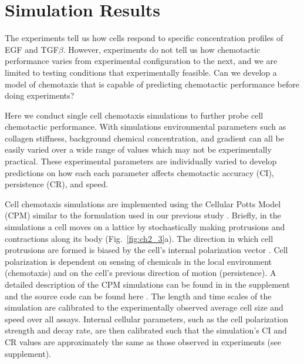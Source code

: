 \section{Simulation Results}

The experiments tell us how cells respond to specific concentration profiles of EGF and TGF$\beta$. However, experiments do not tell us how chemotactic performance varies from experimental configuration to the next, and we are limited to testing conditions that experimentally feasible. Can we develop a model of chemotaxis that is capable of predicting chemotactic performance before doing experiments?

Here we conduct single cell chemotaxis simulations to further probe cell chemotactic performance. With simulations environmental parameters such as collagen stiffness, background chemical concentration, and gradient can all be easily varied over a wide range of values which may not be experimentally practical. These experimental parameters are individually varied to develop predictions on how each each parameter affects chemotactic accuracy (CI), persistence (CR), and speed.

Cell chemotaxis simulations are implemented using the Cellular Potts Model (CPM) similar to the formulation used in our previous study \cite{varennes2016collective}. Briefly, in the simulations a cell moves on a lattice by stochastically making protrusions and contractions along its body (Fig.\ \ref{fig:ch2_3}a). The direction in which cell protrusions are formed is biased by the cell's internal polarization vector \red{[CITE]}. Cell polarization is dependent on sensing of chemicals in the local environment (chemotaxis) and on the cell's previous direction of motion (persistence). A detailed description of the CPM simulations can be found in in the supplement and the source code can be found here \red{[CITE]}.
The length and time scales of the simulation are calibrated to the experimentally observed average cell size and speed over all assays. Internal cellular parameters, such as the cell polarization strength and decay rate, are then calibrated such that the simulation's CI and CR values are approximately the same as those observed in experiments (see supplement).

